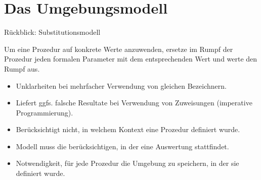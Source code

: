 \section{Das Umgebungsmodell}
\begin{frame}[t,fragile]{Rückblick: Substitutionsmodell}
	\begin{mybox}
		Um eine Prozedur auf konkrete Werte anzuwenden, ersetze im Rumpf der Prozedur jeden formalen Parameter mit dem entsprechenden Wert und werte den Rumpf aus.
	\end{mybox}
	
	\begin{itemize}
		\item<2-> Unklarheiten bei mehrfacher Verwendung von gleichen Bezeichnern.
		\item<2-> Liefert ggfs. falsche Resultate bei Verwendung von Zuweisungen (imperative Programmierung).
		\item<2-> Berücksichtigt nicht, in welchem Kontext eine Prozedur definiert wurde.
	\end{itemize}
	\begin{itemize}
		\item<3-> Modell muss die  berücksichtigen, in der eine Auswertung stattfindet.
		\item<3-> Notwendigkeit, für jede Prozedur die Umgebung zu speichern, in der sie definiert wurde.
	\end{itemize}	
\end{frame}

